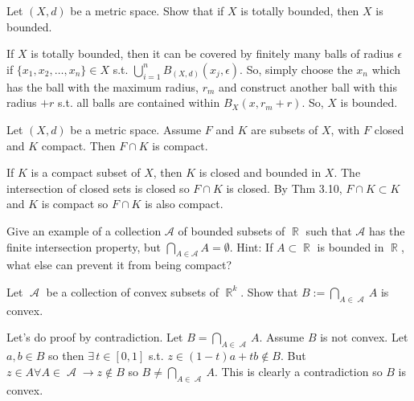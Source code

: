\documentclass[12pt,letterpaper,boxed]{hmcpset}
\DeclareMathOperator{\A}{\mathcal{A}}
\DeclareMathOperator{\R}{\mathbb{R}}
\begin{document}

\begin{problem}[Exercise 2.24]
Let $(X, d)$ be a metric space. Show that if $X$ is totally bounded, then $X$ is bounded.
\end{problem}

\begin{solution}
If $X$ is totally bounded, then it can be covered by finitely many balls of radius $\epsilon$ if $\{x_1, x_2, \dots, x_n\} \in X$ s.t. $\bigcup_{i = 1}^{n} B_{(X, d)}(x_j, \epsilon)$. So, simply choose the $x_n$ which has the ball with the maximum radius, $r_m$ and construct another ball with this radius $ + r$ s.t. all balls are contained within $B_X(x, r_m + r)$. So, $X$ is bounded.
\end{solution}

\begin{problem}[Exercise 3.12]
Let $(X, d)$ be a metric space. Assume $F$ and $K$ are subsets of $X$, with $F$ closed and $K$ compact. Then $F\cap K$ is compact.
\end{problem}

\begin{solution}
If $K$ is a compact subset of $X$, then $K$ is closed and bounded in $X$. The intersection of closed sets is closed so $F\cap K$ is closed. By Thm 3.10, $F \cap K \subset K$ and $K$ is compact so $F \cap K$ is also compact.
\end{solution}

\begin{problem}[Exercise 3.26]
Give an example of a collection $\mathcal{A}$ of bounded subsets of $\R$ such that $\mathcal{A}$ has the finite intersection property, but $\bigcap_{A \in \mathcal{A}} A = \emptyset$. Hint: If $A \subset \R$ is bounded in $\R$, what else can prevent it from being compact?
\end{problem}

\begin{solution}

\end{solution}

\begin{problem}[Exercise 5.3]
Let $\A$ be a collection of convex subsets of $\R^{k}.$ Show that $B := \bigcap_{A \in \A} A$ is convex. 
\end{problem}

\begin{solution}
Let's do proof by contradiction. Let $B=\bigcap_{A \in \A} A$. Assume $B$ is not convex. Let $a, b \in B$ so then $\exists \, t\in [0, 1]$ s.t. $z \in (1 - t)a + tb \notin B$. But $z \in A \forall A \in \A \rightarrow z \notin B$ so $B \neq \bigcap_{A \in \A} A.$ This is clearly a contradiction so $B$ is convex.
\end{solution}
\end{document}
